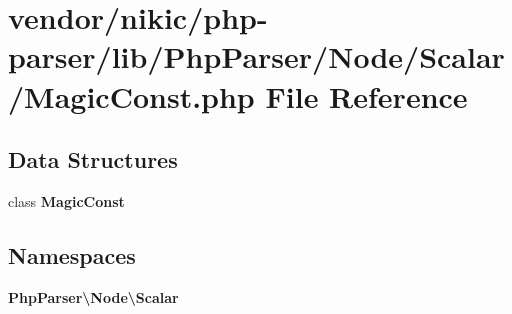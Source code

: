 \section{vendor/nikic/php-\/parser/lib/\+Php\+Parser/\+Node/\+Scalar/\+Magic\+Const.php File Reference}
\label{_magic_const_8php}
\subsection*{Data Structures}
\begin{DoxyCompactItemize}
\item 
class {\bf Magic\+Const}
\end{DoxyCompactItemize}
\subsection*{Namespaces}
\begin{DoxyCompactItemize}
\item 
 {\bf Php\+Parser\textbackslash{}\+Node\textbackslash{}\+Scalar}
\end{DoxyCompactItemize}
